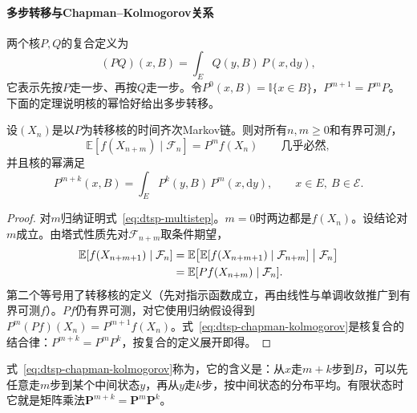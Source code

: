 \paragraph{多步转移与Chapman--Kolmogorov关系}
两个核$P,Q$的复合定义为
\[
  (PQ)(x,B)=\int_E Q(y,B)\,P(x,\mathrm dy),
\]
它表示先按$P$走一步、再按$Q$走一步。令$P^0(x,B)=\mathbb I\{x\in B\}$，$P^{m+1}=P^mP$。下面的定理说明核的幂恰好给出多步转移。

\begin{theorem}
  \label{thm:dtsp-chapman-kolmogorov}
  设$(X_n)$是以$P$为转移核的时间齐次Markov链。则对所有$n,m\geq0$和有界可测$f$，
  \begin{equation}
    \mathbb E[f(X_{n+m})\mid\mathcal F_n]=P^mf(X_n)\qquad\text{几乎必然},
    \label{eq:dtsp-multistep}
  \end{equation}
  并且核的幂满足
  \begin{equation}
    P^{m+k}(x,B)=\int_EP^k(y,B)\,P^m(x,\mathrm dy),\qquad x\in E,\ B\in\mathcal E.
    \label{eq:dtsp-chapman-kolmogorov}
  \end{equation}
\end{theorem}

\begin{proof}
对$m$归纳证明式~\eqref{eq:dtsp-multistep}。$m=0$时两边都是$f(X_n)$。设结论对$m$成立。由塔式性质先对$\mathcal F_{n+m}$取条件期望，
\[
  \begin{aligned}
    \mathbb E[f(X_{n+m+1})\mid\mathcal F_n]
    &=\mathbb E\bigl[\mathbb E[f(X_{n+m+1})\mid\mathcal F_{n+m}]\bigm|\mathcal F_n\bigr]\\
    &=\mathbb E[Pf(X_{n+m})\mid\mathcal F_n].
  \end{aligned}
\]
第二个等号用了转移核的定义（先对指示函数成立，再由线性与单调收敛推广到有界可测$f$）。$Pf$仍有界可测，对它使用归纳假设得到$P^m(Pf)(X_n)=P^{m+1}f(X_n)$。式~\eqref{eq:dtsp-chapman-kolmogorov}是核复合的结合律：$P^{m+k}=P^mP^k$，按复合的定义展开即得。
\end{proof}

式~\eqref{eq:dtsp-chapman-kolmogorov}称为，它的含义是：从$x$走$m+k$步到$B$，可以先任意走$m$步到某个中间状态$y$，再从$y$走$k$步，按中间状态的分布平均。有限状态时它就是矩阵乘法$\bm P^{m+k}=\bm P^m\bm P^k$。

